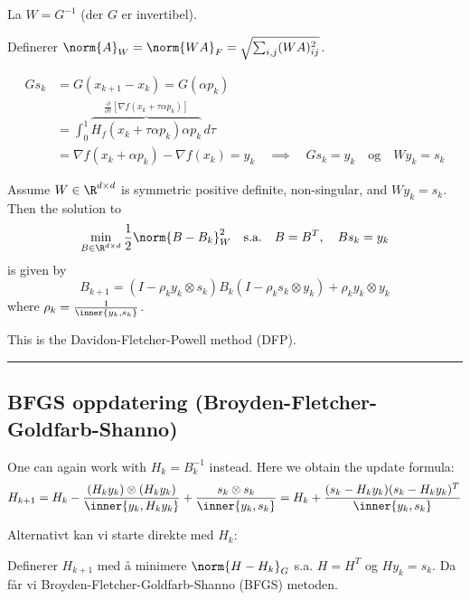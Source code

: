 La \( W = G^{-1} \) (der \( G \) er invertibel).

Definerer \( \norm{A}_W = \norm{WA}_F = \sqrt{\sum_{i,j} (W A)_{ij}^2} \).

\begin{remark}{}{}
	\begin{align*}
		Gs_k & = G(x_{k+1} - x_k) = G(\alpha p_k)                                                                                                                 \\
		     & = \int_0^1 \overbrace{H_f(x_k + \tau \alpha p_k) \alpha p_k}^{\frac{\partial}{\partial \tau}\left[\nabla f(x_k + \tau \alpha p_k)\right]} \, d\tau \\
		     & = \nabla f(x_k + \alpha p_k) - \nabla f(x_k) = y_k \quad \implies \quad Gs_k = y_k \quad \text{og} \quad W y_k = s_k
	\end{align*}
\end{remark}

\begin{theorem}{}{}
	Assume \(W\in \R^{d \times d}\) is symmetric positive definite, non-singular, and \(W y_k = s_k\). Then the solution to
	\[
		\min_{B \in \R^{d \times d}} \frac{1}{2} \norm{B - B_k}_W^2 \quad \text{s.a.} \quad B = B^T, \quad B s_k = y_k
	\]
	is given by
	\[
		B_{k+1} = \left(I - \rho_k y_k \otimes s_k\right) B_k \left(I - \rho_k s_k \otimes y_k\right) + \rho_k y_k \otimes y_k
	\]
	where \( \rho_k = \frac{1}{\inner{y_k, s_k}} \).

	This is the Davidon-Fletcher-Powell method (DFP).
\end{theorem}

\hrule
\vspace{1em}

\subsection*{BFGS oppdatering (Broyden-Fletcher-Goldfarb-Shanno)}

One can again work with \(H_k = B_k^{-1}\) instead.
Here we obtain the update formula:
\[
	H_{k+1} = H_k - \frac{\left(H_k y_k\right) \otimes \left(H_k y_k\right)}{\inner{y_k, H_k y_k}} + \frac{s_k \otimes s_k}{\inner{y_k, s_k}}
	= H_k + \frac{(s_k - H_k y_k)(s_k - H_k y_k)^T}{\inner{y_k, s_k}}
\]

Alternativt kan vi starte direkte med \(H_k \):

Definerer \( H_{k+1} \) med å minimere \( \norm{H - H_k}_G \) s.a. \( H = H^T \) og \( H y_k = s_k \).
Da får vi Broyden-Fletcher-Goldfarb-Shanno (BFGS) metoden.

